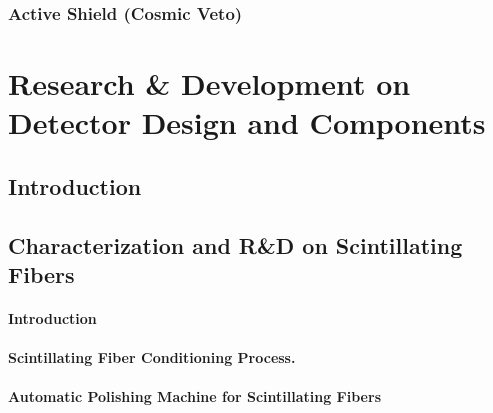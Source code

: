 \documentclass[12pt,a4paper]{book}
\begin{document}
		\subsection{Active Shield (Cosmic Veto)}\label{subsec:SetUpActiveShield}
		
		\newpage
					
\chapter[Research \& Development]{Research \& Development on Detector Design and Components}\label{chap:ResearchandDevelopment}
	\section{Introduction}\label{sec:IntroCharacterisation}
	
	\newpage
	
	\section[Characetrization of the Scintillating Fibers]{Characterization and R\&D on Scintillating Fibers}\label{sec:CharacterizationScintillatingFibers}
	
		\subsubsection{Introduction}\label{subsubsec:IntroFibersResults}
		
		
		\subsubsection[Conditioning Process]{Scintillating Fiber Conditioning Process.}\label{subsubsec:ConditioningProcess}
		
				
		\subsubsection[Automatic Polishing Machine]{Automatic Polishing Machine for Scintillating Fibers}\label{subsubsec:PolishingMachine}
		
		
\end{document}
